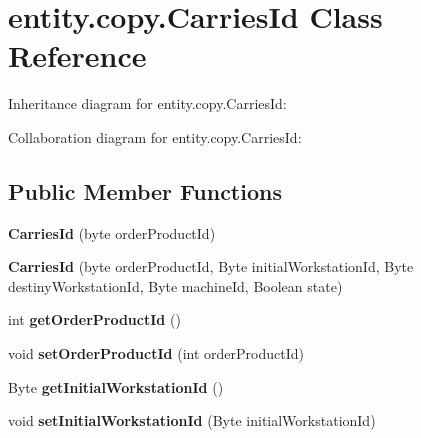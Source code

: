 \hypertarget{classentity_1_1copy_1_1_carries_id}{}\section{entity.\+copy.\+Carries\+Id Class Reference}
\label{classentity_1_1copy_1_1_carries_id}


Inheritance diagram for entity.\+copy.\+Carries\+Id\+:


Collaboration diagram for entity.\+copy.\+Carries\+Id\+:
\subsection*{Public Member Functions}
\begin{DoxyCompactItemize}
\item 
\mbox{\label{classentity_1_1copy_1_1_carries_id_aed584e777849953ca686b1ed2ec249d1}} 
{\bfseries Carries\+Id} (byte order\+Product\+Id)
\item 
\mbox{\label{classentity_1_1copy_1_1_carries_id_a3adc4e3947e439c8c23b9e91a68de5aa}} 
{\bfseries Carries\+Id} (byte order\+Product\+Id, Byte initial\+Workstation\+Id, Byte destiny\+Workstation\+Id, Byte machine\+Id, Boolean state)
\item 
\mbox{\label{classentity_1_1copy_1_1_carries_id_ae26aa1ca3dc654b2c255a004c493b47d}} 
int {\bfseries get\+Order\+Product\+Id} ()
\item 
\mbox{\label{classentity_1_1copy_1_1_carries_id_a074d02bc965f66a407a4aa8780c06b97}} 
void {\bfseries set\+Order\+Product\+Id} (int order\+Product\+Id)
\item 
\mbox{\label{classentity_1_1copy_1_1_carries_id_acd710775871c86cf48f0c93a4af87779}} 
Byte {\bfseries get\+Initial\+Workstation\+Id} ()
\item 
\mbox{\label{classentity_1_1copy_1_1_carries_id_abbdc0b1d8993920dc1a582bf6757b51a}} 
void {\bfseries set\+Initial\+Workstation\+Id} (Byte initial\+Workstation\+Id)
\item 

\end{DoxyCompactItemize}
